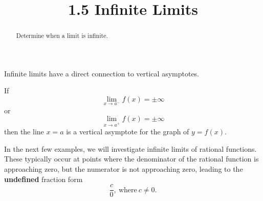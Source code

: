 \documentclass{ximera}
\title{1.5 Infinite Limits}
\begin{document}
\begin{abstract}
Determine when a limit is infinite.
\end{abstract}

\maketitle

Infinite limits have a direct connection to vertical asymptotes.
\begin{theorem}
If 
\[
\lim_{x \to a^-} f(x) = \pm \infty
\]
or
\[
\lim_{x \to a^+} f(x) = \pm \infty
\]
then the line $x=a$ is a vertical asymptote for the graph of $y=f(x)$.\\
\end{theorem}




In the next few examples, we will investigate infinite limits of rational functions. 
These typically occur at points where the denominator of the rational function is approaching zero, 
but the numerator is not approaching zero, leading to the \textbf{undefined} fraction form
\[
\frac{c}{0}, \ \text{where} \ c \neq 0.
\]
\end{document}
